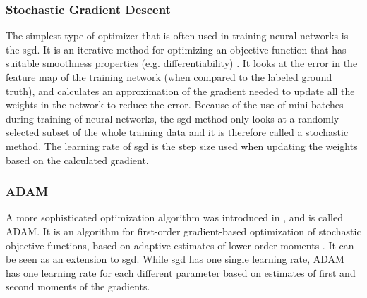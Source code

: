 \subsubsection{Stochastic Gradient Descent}
The simplest type of optimizer that is often used in training neural networks is the \acrfull{sgd}. It is an iterative method for optimizing an objective function that has suitable smoothness properties (e.g. differentiability) \cite{stochasticgradientdescent}. It looks at the error in the feature map of the training network (when compared to the labeled ground truth), and calculates an approximation of the gradient needed to update all the weights in the network to reduce the error. Because of the use of mini batches during training of neural networks, the \acrshort{sgd} method only looks at a randomly selected subset of the whole training data and it is therefore called a stochastic method. The learning rate of \acrshort{sgd} is the step size used when updating the weights based on the calculated gradient.

\subsubsection{ADAM}
A more sophisticated optimization algorithm was introduced in \citeyear{kingma2015adam}, and is called ADAM. It is an algorithm for first-order gradient-based optimization of stochastic objective functions, based on adaptive estimates of lower-order moments \cite{kingma2015adam}. It can be seen as an extension to \acrshort{sgd}. While \acrshort{sgd} has one single learning rate, ADAM has one learning rate for each different parameter based on estimates of first and second moments of the gradients. 